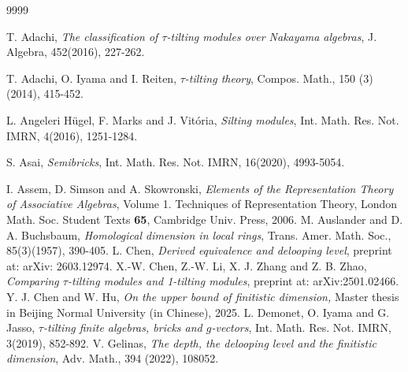 \documentclass[a4paper]{amsart}
\theoremstyle{definition}
\theoremstyle{remark}
\numberwithin{equation}{section}
\begin{document}


\begin{thebibliography}{9999}

 {\sc T. Adachi}, {\em The classification of $\tau$-tilting modules over Nakayama
algebras}, J. Algebra, 452(2016), 227-262.

 {\sc T. Adachi,  O. Iyama and I. Reiten}, {\em  $\tau$-tilting theory}, Compos. Math., {150} (3) (2014), 415-452.

 {\sc L. Angeleri H\"{u}gel, F. Marks and J. Vit\'oria}, {\em  Silting
modules}, Int. Math. Res. Not. IMRN, 4(2016), 1251-1284.


  {\sc S. Asai}, {\em Semibricks}, Int. Math. Res. Not. IMRN, 16(2020), 4993-5054.

 {\sc I. Assem, D. Simson and A. Skowronski}, {\em Elements of the Representation Theory of Associative Algebras}, Volume 1. Techniques of Representation Theory, London Math. Soc. Student Texts {\bf 65}, Cambridge Univ. Press, 2006.
  {\sc  M. Auslander and D. A. Buchsbaum}, {\em Homological dimension in local rings}, Trans. Amer. Math. Soc., {85}(3)(1957), 390-405.
 {\sc L. Chen}, {\em Derived equivalence and delooping level}, preprint at: arXiv: 2603.12974.
 {\sc X.-W. Chen, Z.-W. Li, X. J. Zhang and Z. B. Zhao}, {\em Comparing $\tau$-tilting modules and 1-tilting modules}, preprint at: arXiv:2501.02466.
 {\sc Y. J. Chen and W. Hu}, {\em On the upper bound of finitistic dimension,} Master thesis in Beijing Normal University (in Chinese), 2025.
 {\sc L. Demonet, O. Iyama and G. Jasso}, {\em $\tau$-tilting finite algebras, bricks and $g$-vectors}, Int. Math. Res. Not. IMRN, 3(2019), 852-892.
 {\sc V. Gelinas}, {\em The depth, the delooping level and the finitistic dimension}, Adv. Math., {394}   (2022), 108052.


\end{thebibliography}
\end{document}

